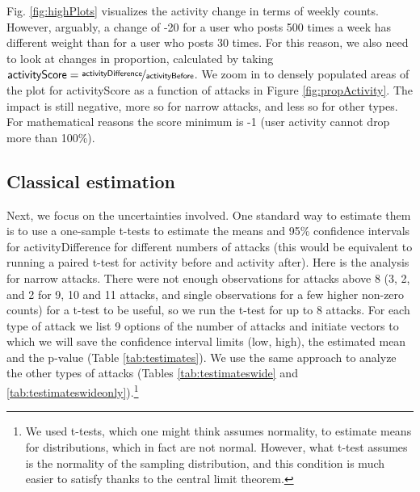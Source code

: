 \documentclass[10pt,dvipsnames]{scrartcl}
\begin{document}
Fig. \ref{fig:highPlots} visualizes the activity change in terms of
weekly counts. However, arguably, a change of -20 for a user who posts
500 times a week has different weight than for a user who posts 30
times. For this reason, we also need to look at changes in proportion,
calculated by taking
\(\mathsf{activityScore} = \nicefrac{\mathsf{activityDifference}}{\mathsf{activityBefore}}\).
We zoom in to densely populated areas of the plot for
\textsf{activityScore} as a function of attacks in Figure
\ref{fig:propActivity}. The impact is still negative, more so for
\textsf{narrow} attacks, and less so for other types. For mathematical
reasons the score minimum is -1 (user activity cannot drop more than
100\%).

\subsection{Classical estimation}

Next, we focus on the uncertainties involved. One standard way to
estimate them is to use a one-sample t-tests to estimate the means and
95\% confidence intervals for \textsf{activityDifference} for different
numbers of attacks (this would be equivalent to running a paired t-test
for activity before and activity after). Here is the analysis for narrow
attacks. There were not enough observations for attacks above 8 (3, 2,
and 2 for 9, 10 and 11 attacks, and single observations for a few higher
non-zero counts) for a t-test to be useful, so we run the t-test for up
to 8 attacks. For each type of attack we list 9 options of the number of
attacks and initiate vectors to which we will save the confidence
interval limits (\textsf{low}, \textsf{high}), the estimated mean and
the \textsf{p}-value (Table \ref{tab:testimates}). We use the same
approach to analyze the other types of attacks (Tables
\ref{tab:testimateswide} and
\ref{tab:testimateswideonly}).\footnote{We used t-tests, which one might think assumes normality, to estimate means  for distributions, which in fact  are not normal. However, what t-test assumes is the normality of the sampling distribution, and this condition is much easier to satisfy thanks to the central limit theorem.}

\footnotesize

\normalsize

\footnotesize

\normalsize
\end{document}
